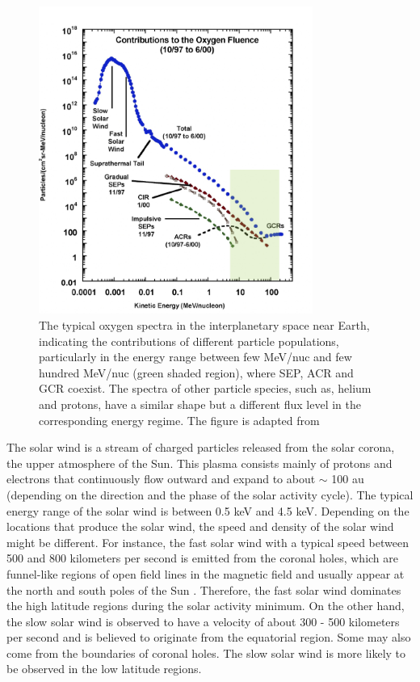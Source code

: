 \begin{figure}[!htb]
    \centering
    \includegraphics[width = 0.8\textwidth]{images/heliospheric_particle_spectra_color.png}
    \caption[Energy spectra of oxygen ions in near-Earth space]{The typical oxygen spectra in the interplanetary space near Earth, indicating the contributions of different particle populations, particularly in the energy range between few MeV/nuc and few hundred MeV/nuc (green shaded region), where \acs{SEP}, \acs{ACR} and \acs{GCR} coexist. The spectra of other particle species, such as, helium and protons, have a similar shape but a different flux level in the corresponding energy regime. The figure is adapted from \citet{Mewaldt-2001}}
    \label{Fig:Oxygen_spectra_heliosphere}
\end{figure}


The solar wind is a stream of charged particles released from the solar corona, the upper atmosphere of the Sun. This plasma consists mainly of protons and electrons that continuously flow outward and expand to about $\sim$ 100 au (depending on the direction and the phase of the solar activity cycle). The typical energy range of the solar wind is between 0.5 keV and 4.5 keV. Depending on the locations that produce the solar wind, the speed and density of the solar wind might be different. For instance, the fast solar wind with a typical speed between 500 and 800 kilometers per second is emitted from the coronal holes, which are funnel-like regions of open field lines in the magnetic field and usually appear at the north and south poles of the Sun \citep{Sakao2007, Tu2005, hundhausen1968state}. Therefore, the fast solar wind dominates the high latitude regions during the solar activity minimum. On the other hand, the slow solar wind is observed to have a velocity of about 300 - 500 kilometers per second and is believed to originate from the equatorial region. Some may also come from the boundaries of coronal holes. The slow solar wind is more likely to be observed in the low latitude regions.


